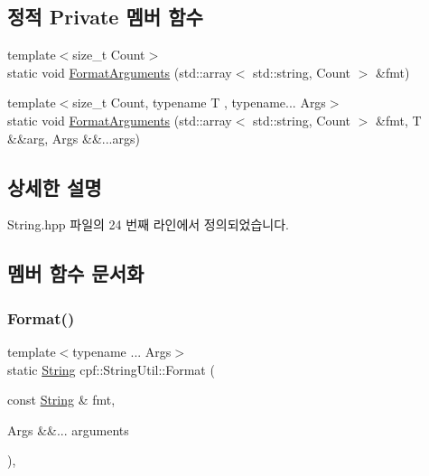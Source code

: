 \subsection*{정적 Private 멤버 함수}
\begin{DoxyCompactItemize}
\item 
{\footnotesize template$<$size\+\_\+t Count$>$ }\\static void \hyperlink{classcpf_1_1_string_util_af6a0483e9f189a49f9f25a6ca74d94a2}{Format\+Arguments} (std\+::array$<$ std\+::string, Count $>$ \&fmt)
\item 
{\footnotesize template$<$size\+\_\+t Count, typename T , typename... Args$>$ }\\static void \hyperlink{classcpf_1_1_string_util_a42ad0dd4e29fef98117340ae1193cd95}{Format\+Arguments} (std\+::array$<$ std\+::string, Count $>$ \&fmt, T \&\&arg, Args \&\&...args)
\end{DoxyCompactItemize}


\subsection{상세한 설명}


String.\+hpp 파일의 24 번째 라인에서 정의되었습니다.



\subsection{멤버 함수 문서화}
\mbox{\label{classcpf_1_1_string_util_a965cca44ea396f01f2f3c5e3851f1001}} 
\subsubsection{\texorpdfstring{Format()}{Format()}}
{\footnotesize\ttfamily template$<$typename ... Args$>$ \\
static \hyperlink{namespacecpf_a4dbd6992c3ed4440ce7ed8982ff7ffea}{String} cpf\+::\+String\+Util\+::\+Format (\begin{DoxyParamCaption}\item[{const \hyperlink{namespacecpf_a4dbd6992c3ed4440ce7ed8982ff7ffea}{String} \&}]{fmt,  }\item[{Args \&\&...}]{arguments }\end{DoxyParamCaption})\hspace{0.3cm}{\ttfamily [inline]}, {\ttfamily [static]}}



